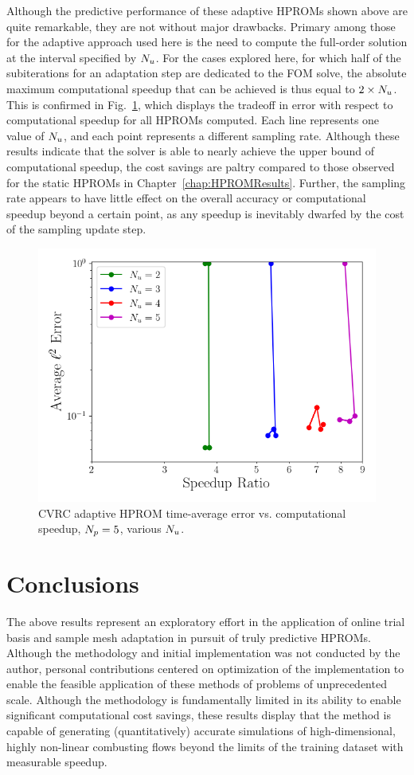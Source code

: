 Although the predictive performance of these adaptive HPROMs shown above are quite remarkable, they are not without major drawbacks. Primary among those for the adaptive approach used here is the need to compute the full-order solution at the interval specified by $N_u$. For the cases explored here, for which half of the subiterations for an adaptation step are dedicated to the FOM solve, the absolute maximum computational speedup that can be achieved is thus equal to $2 \times N_u$. This is confirmed in Fig.~\ref{fig:cvrcAdaptivePareto}, which displays the tradeoff in error with respect to computational speedup for all HPROMs computed. Each line represents one value of $N_u$, and each point represents a different sampling rate. Although these results indicate that the solver is able to nearly achieve the upper bound of computational speedup, the cost savings are paltry compared to those observed for the static HPROMs in Chapter~\ref{chap:HPROMResults}. Further, the sampling rate appears to have little effect on the overall accuracy or computational speedup beyond a certain point, as any speedup is inevitably dwarfed by the cost of the sampling update step.

\begin{figure}
    \centering
    \includegraphics[width=0.5\linewidth]{Chapters/AdaptiveResults/Images/cvrc/pareto_wrt_iters_Average_errorRaw_pareto.png}
    \caption{\label{fig:cvrcAdaptivePareto}CVRC adaptive HPROM time-average error vs. computational speedup, $N_p = 5$, various $N_u$.}
\end{figure}

\section{Conclusions}

The above results represent an exploratory effort in the application of online trial basis and sample mesh adaptation in pursuit of truly predictive HPROMs. Although the methodology and initial implementation was not conducted by the author, personal contributions centered on optimization of the implementation to enable the feasible application of these methods of problems of unprecedented scale. Although the methodology is fundamentally limited in its ability to enable significant computational cost savings, these results display that the method is capable of generating (quantitatively) accurate simulations of high-dimensional, highly non-linear combusting flows beyond the limits of the training dataset with measurable speedup. 